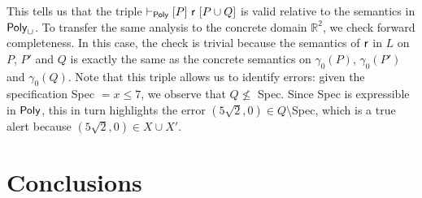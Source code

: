 \begin{example}
	This tells us that the triple $\vdash_{\mathsf{Poly}}\nobreak[P]~\mathsf{r}~[P \cup Q]$ is valid relative to the semantics in $\mathsf{Poly}_{\cup}$. To transfer the same analysis to the concrete domain $\mathbb{R}^2$, we  check forward completeness. In this case, the check is trivial because the semantics of $\mathsf{r}$ in $L$ on $P$, $P'$ and $Q$ is exactly the same as the concrete semantics on $\gamma_0(P)$, $\gamma_0(P')$ and $\gamma_0(Q)$.
	Note that this triple allows us to identify errors: given the specification Spec $= x \le 7$, we observe that $Q \nleq $ Spec. Since Spec is expressible in $\mathsf{Poly}$, this in turn highlights the error $(5 \sqrt{2}, 0) \in Q \setminus $Spec, which is a true alert because $(5 \sqrt{2}, 0) \in X \cup X'$.
\end{example}

\section{Conclusions}
